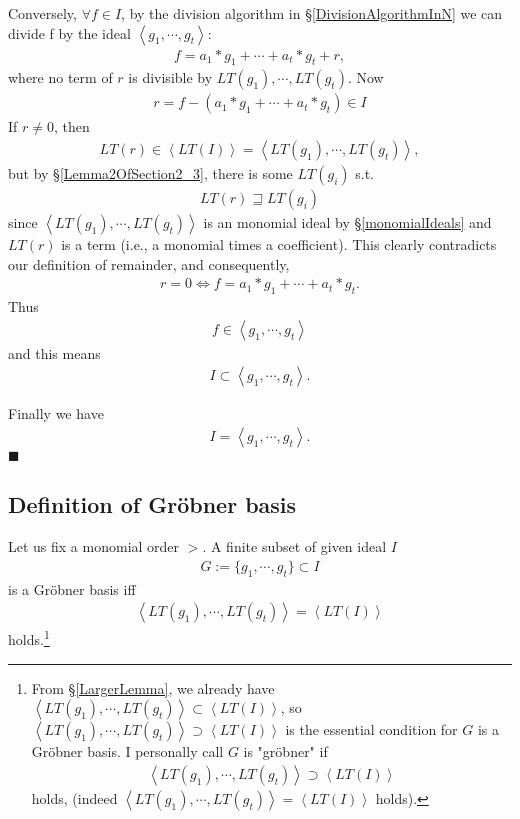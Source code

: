 \documentclass[11pt]{book}
\begin{document}
Conversely, $\forall f \in I$, by the division algorithm in \S\ref{DivisionAlgorithmInN} we can divide f by the ideal $\left< g_1, \cdots, g_t \right>$:
\begin{eqnarray}
f = a_1 * g_1 + \cdots + a_t * g_t + r,
\end{eqnarray}
where no term of $r$ is divisible by $LT(g_1), \cdots, LT(g_t)$.
Now
\begin{eqnarray}
r = f - \left( a_1 * g_1 + \cdots + a_t * g_t \right) \in I
\end{eqnarray}
If $r \neq 0$, then 
\begin{eqnarray}
LT(r) \in \left< LT(I) \right> = \left< LT(g_1), \cdots, LT(g_t) \right>,
\end{eqnarray}
but by \S\ref{Lemma2OfSection2_3}, there is some $LT(g_i)$ s.t.
\begin{eqnarray}
LT(r) \sqsupseteq LT(g_i)
\end{eqnarray}
since $\left< LT(g_1), \cdots, LT(g_t) \right>$ is an monomial ideal by \S\ref{monomialIdeals} and $LT(r)$ is a term (i.e., a monomial times a coefficient).
This clearly contradicts our definition of remainder, and consequently,
\begin{eqnarray}
\label{nullRemainder}
r = 0 \Leftrightarrow f = a_1 * g_1 + \cdots + a_t * g_t.
\end{eqnarray}
Thus
\begin{eqnarray}
f \in \left< g_1, \cdots, g_t \right>
\end{eqnarray}
and this means 
\begin{eqnarray}
\label{HilbertSupset}
I \subset \left< g_1, \cdots, g_t \right>.
\end{eqnarray}

Finally we have
\begin{eqnarray}
\label{HilbertGenerators}
I = \left< g_1, \cdots, g_t \right>.
\end{eqnarray}
$\blacksquare$

\subsection{Definition of Gr\"obner basis}
\label{DefOfGroebner}
Let us fix a monomial order $>$.
A finite subset of given ideal $I$
\begin{eqnarray}
G := \{g_1, \cdots, g_t\} \subset I
\end{eqnarray}
is a Gr\"obner basis iff 
\begin{eqnarray}
\left< LT(g_1), \cdots, LT(g_t) \right> = \left< LT(I)\right>
\end{eqnarray}
holds.\footnote{
From \S\ref{LargerLemma}, we already have $\left< LT(g_1), \cdots, LT(g_t) \right> \subset \left< LT(I) \right>$, so $\left< LT(g_1), \cdots, LT(g_t) \right> \supset \left< LT(I) \right>$ is the essential condition for $G$ is a Gr\"obner basis.
I personally call $G$ is "gr\"obner" if 
\begin{eqnarray}
\label{isGroebner}
\left< LT(g_1), \cdots, LT(g_t) \right> \supset \left< LT(I) \right>
\end{eqnarray}
holds, (indeed $\left< LT(g_1), \cdots, LT(g_t) \right> = \left< LT(I) \right>$ holds).
}
\end{document}
